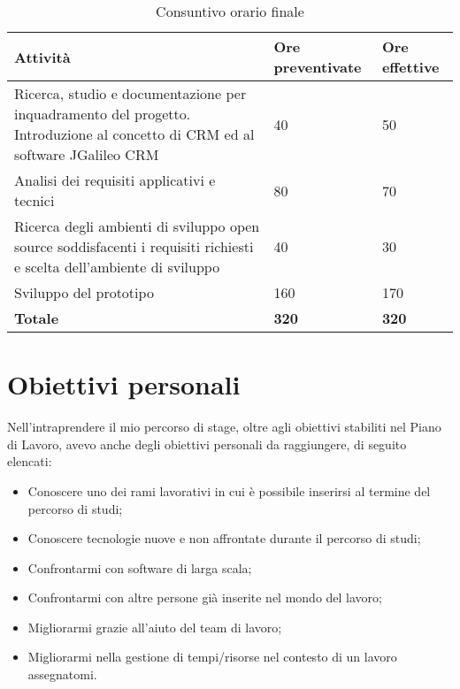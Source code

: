 \begin{table} %
	\centering
	\caption{Consuntivo orario finale}
	\label{tab:consuntivo-ore}
	\begin{tabular}{|p{9cm}|p{2cm}|p{2cm}|}
		\hline
		\rule[-4mm]{0mm}{1cm}
		\textbf{Attività} & \textbf{Ore preventivate} & \textbf{Ore effettive}\\
		\hline
		\rule[-3mm]{0mm}{0.8cm}	
		Ricerca, studio e documentazione per inquadramento del
		progetto.
		Introduzione al concetto di CRM ed al software JGalileo CRM & 40 & 50\\
		\hline
		\rule[-3mm]{0mm}{0.8cm}	
		Analisi dei requisiti applicativi e tecnici & 80 & 70\\
		\hline
		\rule[-3mm]{0mm}{0.8cm}	
		Ricerca degli ambienti di sviluppo open source soddisfacenti i requisiti richiesti e scelta dell’ambiente di sviluppo& 40 & 30\\
		\hline
		\rule[-3mm]{0mm}{0.8cm}	
		Sviluppo del prototipo & 160 & 170\\
		\hline
		\rule[-3mm]{0mm}{0.8cm}		
		\textbf{Totale} & \textbf{320} & \textbf{320}\\
		\hline	
	\end{tabular}
\end{table}

\section {Obiettivi personali}
Nell'intraprendere il mio percorso di stage, oltre agli obiettivi stabiliti nel Piano di Lavoro, avevo anche degli obiettivi personali da raggiungere, di seguito elencati:
\begin{itemize}
	\item Conoscere uno dei rami lavorativi in cui è possibile inserirsi al termine del percorso di studi;
	\item Conoscere tecnologie nuove e non affrontate durante il percorso di studi;
	\item Confrontarmi con software di larga scala;
	\item Confrontarmi con altre persone già inserite nel mondo del lavoro;
	\item Migliorarmi grazie all'aiuto del team di lavoro;
	\item Migliorarmi nella gestione di tempi/risorse nel contesto di un lavoro assegnatomi.
\end{itemize}

